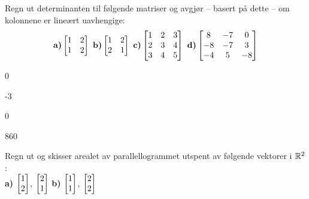 
\begin{oppgave}
Regn ut determinanten til følgende matriser og avgjør -- basert på dette -- om kolonnene er lineært uavhengige:
\vspace{-8pt}
\[
\text{\textbf{a)}}
\begin{bmatrix}
1 & 2\\
1 & 2
\end{bmatrix}
\ %
\text{\textbf{b)}}
\begin{bmatrix}
1 & 2\\
2 & 1
\end{bmatrix}
\ %
\text{\textbf{c)}}
\begin{bmatrix}
1 & 2 & 3\\
2 & 3 & 4\\
3 & 4 & 5
\end{bmatrix}
\ %
\text{\textbf{d)}}
\begin{bmatrix}
8 & -7 & 0\\
-8 & -7 & 3\\
-4 & 5 & -8
\end{bmatrix}
\]
\end{oppgave}

\begin{losning}

\begin{punkt}
0
\end{punkt}

\begin{punkt}
-3
\end{punkt}

\begin{punkt}
0
\end{punkt}

\begin{punkt}
860
\end{punkt}

\end{losning}


\begin{oppgave}
Regn ut og skisser arealet av parallellogrammet utspent av følgende
vektorer i $\mathbb{R}^2$:
\\[4pt]
\textbf{a)}
$\begin{bmatrix} 1 \\ 2 \end{bmatrix}$, $\begin{bmatrix} 2 \\ 1 \end{bmatrix}$
\qquad
\textbf{b)}
$\begin{bmatrix} 1 \\ 1 \end{bmatrix}$, $\begin{bmatrix} 2 \\ 2 \end{bmatrix}$
\end{oppgave}

